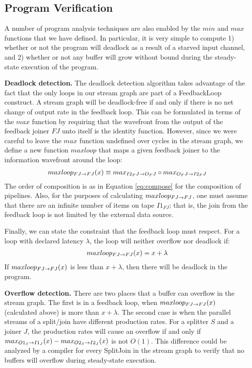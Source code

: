 \subsection{Program Verification}

A number of program analysis techniques are also enabled by the $min$
and $max$ functions that we have defined.  In particular, it is very
simple to compute 1) whether or not the program will deadlock as a
result of a starved input channel, and 2) whether or not any buffer
will grow without bound during the steady-state execution of the
program.

{\bf Deadlock detection.}  The deadlock detection algorithm takes
advantage of the fact that the only loops in our stream graph are part
of a FeedbackLoop construct.  A stream graph will be deadlock-free if
and only if there is no net change of output rate in the feedback
loop.  This can be formulated in terms of the $max$ function by
requiring that the wavefront from the output of the feedback joiner
$FJ$ unto itself is the identity function.  However, since we were
careful to leave the $max$ function undefined over cycles in the
stream graph, we define a new function $maxloop$ that maps a given
feedback joiner to the information wavefront around the loop:
\begin{align*}
maxloop_{FJ \rightarrow FJ}(x) \equiv max_{I2_FJ \rightarrow O_FJ} \circ max_{O_FJ \rightarrow I2_FJ}
\end{align*}
The order of composition is as in Equation \ref{eq:compose} for the
composition of pipelines. Also, for the purposes of calculating
$maxloop_{FJ \rightarrow FJ}$, one must assume that there are an infinite number of items
on tape $I1_{FJ}$; that is, the join from the feedback loop is not
limited by the external data source.

Finally, we can state the constraint that the feedback loop must
respect.  For a loop with declared latency $\lambda$, the loop will neither
overflow nor deadlock if:
\begin{align*}
maxloop_{FJ \rightarrow FJ}(x) = x + \lambda
\end{align*}
If $maxloop_{FJ \rightarrow FJ}(x)$ is less than $x + \lambda$, then there will be deadlock in
the program.

{\bf Overflow detection.}  There are two places that a buffer can
overflow in the stream graph.  The first is in a feedback loop, when
$maxloop_{FJ \rightarrow FJ}(x)$ (calculated above) is more than $x + \lambda$.  The second
case is when the parallel streams of a split/join have different
production rates.  For a splitter $S$ and a joiner $J$, the production
rates will cause an overflow if and only if $max_{O1_S \rightarrow I1_J}(x) -
max_{O2_S \rightarrow I2_J}(x)$ is not $O(1)$.  This difference could be analyzed
by a compiler for every SplitJoin in the stream graph to verify that
no buffers will overflow during steady-state execution.



